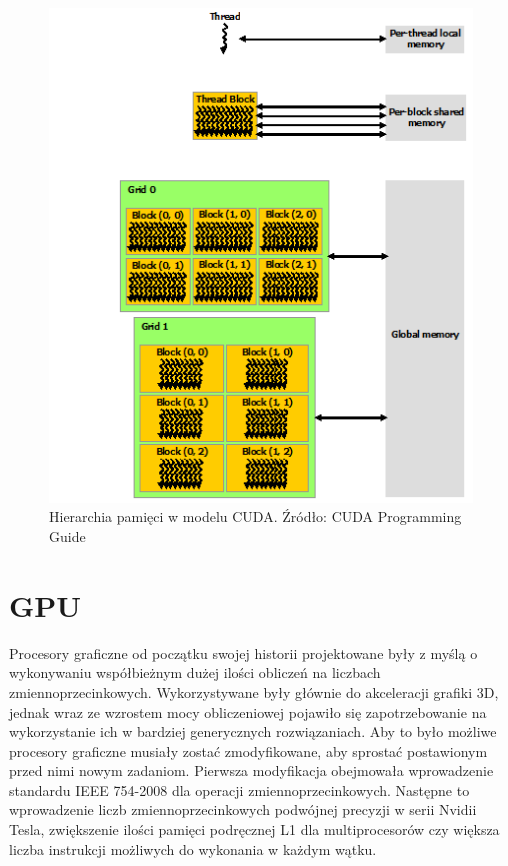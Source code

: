 \begin{figure}[ht]
\centering
\includegraphics[scale=0.8]{images/memory-hierarchy.png}
\caption{Hierarchia pamięci w modelu CUDA. Źródło: CUDA Programming Guide}
\label{hier}
\end{figure}

\section{GPU}

Procesory graficzne od początku swojej historii projektowane były z myślą o
wykonywaniu współbieżnym dużej ilości obliczeń na liczbach zmiennoprzecinkowych. 
Wykorzystywane były głównie do akceleracji grafiki 3D, jednak wraz ze wzrostem mocy obliczeniowej
pojawiło się zapotrzebowanie na wykorzystanie ich w bardziej
generycznych rozwiązaniach. Aby to było możliwe procesory graficzne musiały
zostać zmodyfikowane, aby sprostać postawionym przed nimi nowym zadaniom.
Pierwsza modyfikacja obejmowała wprowadzenie standardu IEEE 754-2008 dla
operacji zmiennoprzecinkowych. Następne to wprowadzenie liczb
zmiennoprzecinkowych podwójnej precyzji w serii Nvidii Tesla, zwiększenie ilości
pamięci podręcznej L1 dla multiprocesorów czy większa liczba instrukcji
możliwych do wykonania w każdym wątku.

